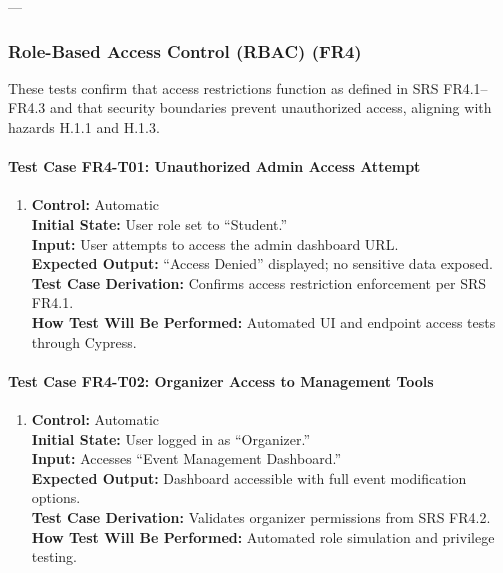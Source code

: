 \documentclass[12pt, titlepage]{article}
\begin{document}
---

\subsubsection{Role-Based Access Control (RBAC) (FR4)}

These tests confirm that access restrictions function as defined in SRS FR4.1–FR4.3 and that security boundaries prevent unauthorized access, aligning with hazards H.1.1 and H.1.3.

\paragraph{Test Case FR4-T01: Unauthorized Admin Access Attempt}

\begin{enumerate}
    \item \textbf{Control:} Automatic\\
    \textbf{Initial State:} User role set to “Student.”\\
    \textbf{Input:} User attempts to access the admin dashboard URL.\\
    \textbf{Expected Output:} “Access Denied” displayed; no sensitive data exposed.\\
    \textbf{Test Case Derivation:} Confirms access restriction enforcement per SRS FR4.1.\\
    \textbf{How Test Will Be Performed:} Automated UI and endpoint access tests through Cypress.
\end{enumerate}

\paragraph{Test Case FR4-T02: Organizer Access to Management Tools}

\begin{enumerate}
    \item \textbf{Control:} Automatic\\
    \textbf{Initial State:} User logged in as “Organizer.”\\
    \textbf{Input:} Accesses “Event Management Dashboard.”\\
    \textbf{Expected Output:} Dashboard accessible with full event modification options.\\
    \textbf{Test Case Derivation:} Validates organizer permissions from SRS FR4.2.\\
    \textbf{How Test Will Be Performed:} Automated role simulation and privilege testing.
\end{enumerate}
\end{document}
